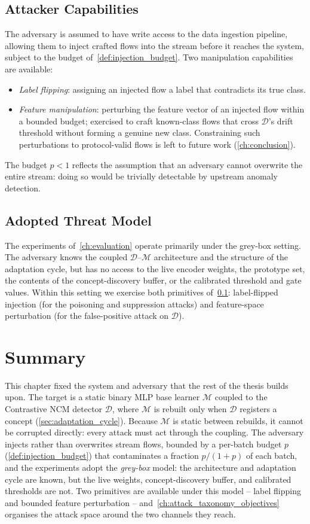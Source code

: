 \subsection{Attacker Capabilities}
\label{sec:attacker_capabilities}
The adversary is assumed to have write access to the data ingestion pipeline, allowing them to inject crafted flows into the stream before it reaches the system, subject to the budget of~\cref{def:injection_budget}. Two manipulation capabilities are available:
\begin{itemize}
    \item \textit{Label flipping}: assigning an injected flow a label that contradicts its true class.

    \item \textit{Feature manipulation}: perturbing the feature vector of an injected flow within a bounded budget; exercised to craft known-class flows that cross $\mathcal{D}$'s drift threshold without forming a genuine new class. Constraining such perturbations to protocol-valid flows is left to future work (\cref{ch:conclusion}).
\end{itemize}
The budget $p < 1$ reflects the assumption that an adversary cannot overwrite the entire stream: doing so would be trivially detectable by upstream anomaly detection.

\subsection{Adopted Threat Model}
The experiments of~\cref{ch:evaluation} operate primarily under the grey-box setting. The adversary knows the coupled $\mathcal{D}$--$\mathcal{M}$ architecture and the structure of the adaptation cycle, but has no access to the live encoder weights, the prototype set, the contents of the concept-discovery buffer, or the calibrated threshold and gate values. Within this setting we exercise both primitives of~\cref{sec:attacker_capabilities}: label-flipped injection (for the poisoning and suppression attacks) and feature-space perturbation (for the false-positive attack on $\mathcal{D}$).

\section{Summary}
\label{sec:tm-summary}
This chapter fixed the system and adversary that the rest of the thesis builds upon. The target is a static binary MLP base learner $\mathcal{M}$ coupled to the Contrastive NCM detector $\mathcal{D}$, where $\mathcal{M}$ is rebuilt only when $\mathcal{D}$ registers a concept (\cref{sec:adaptation_cycle}). Because $\mathcal{M}$ is static between rebuilds, it cannot be corrupted directly: every attack must act through the coupling. The adversary injects rather than overwrites stream flows, bounded by a per-batch budget $p$ (\cref{def:injection_budget}) that contaminates a fraction $p/(1+p)$ of each batch, and the experiments adopt the \emph{grey-box} model: the architecture and adaptation cycle are known, but the live weights, concept-discovery buffer, and calibrated thresholds are not. Two primitives are available under this model -- label flipping and bounded feature perturbation -- and~\cref{ch:attack_taxonomy_objectives} organises the attack space around the two channels they reach.
